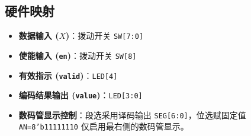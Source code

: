 \documentclass[12pt, a4paper]{ctexart}
\begin{document}
\subsection{硬件映射}
\begin{itemize}
    \item \textbf{数据输入 ($X$)}：拨动开关 \texttt{SW[7:0]}
    \item \textbf{使能输入 (\texttt{en})}：拨动开关 \texttt{SW[8]}
    \item \textbf{有效指示 (\texttt{valid})}：\texttt{LED[4]}
    \item \textbf{编码结果输出 (\texttt{value})}：\texttt{LED[3:0]}
    \item \textbf{数码管显示控制}：段选采用译码输出 \texttt{SEG[6:0]}，位选赋固定值 \texttt{AN=8'b11111110} 仅启用最右侧的数码管显示。
\end{itemize}
\end{document}
